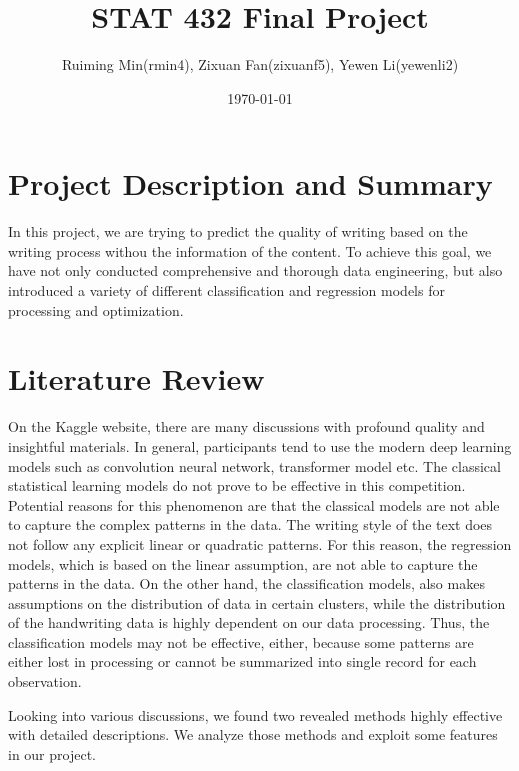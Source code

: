 \documentclass[8pt]{report}
\title{STAT 432 Final Project}
\author{Ruiming Min(rmin4), Zixuan Fan(zixuanf5), Yewen Li(yewenli2)}
\date{\today}
\begin{document}
\maketitle

\section{Project Description and Summary}

In this project, we are trying to predict the quality of writing based on the writing process withou the information of the content. 
To achieve this goal, we have not only conducted comprehensive and thorough data engineering, but also introduced a variety of different classification and regression models for processing and optimization.




\section{Literature Review}
On the Kaggle website, there are many discussions with profound quality and insightful materials. 
In general, participants tend to use the modern deep learning models such as convolution neural network,
transformer model etc. The classical statistical learning models do not prove to be effective in this competition. 
Potential reasons for this phenomenon are that the classical models are not able to capture the complex patterns in the data. 
The writing style of the text does not follow any explicit linear or quadratic patterns. 
For this reason, the regression models, which is based on the linear assumption, are not able to capture the patterns in the data.
On the other hand, the classification models, also makes assumptions on the distribution of data in certain clusters, 
while the distribution of the handwriting data is highly dependent on our data processing. 
Thus, the classification models may not be effective, either, because some patterns are either lost in processing or cannot be summarized into single 
record for each observation. 

Looking into various discussions, we found two revealed methods highly effective with detailed descriptions. 
We analyze those methods and exploit some features in our project. 
\end{document}
